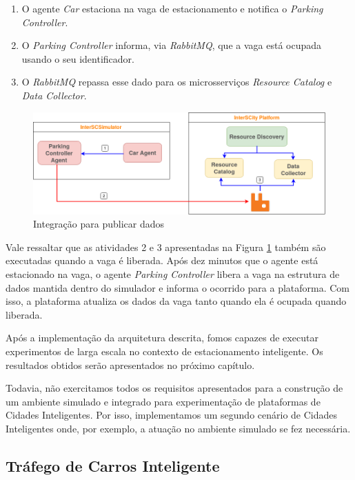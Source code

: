 \begin{enumerate}
    \item O agente \textit{Car} estaciona na vaga de estacionamento e notifica o \textit{Parking Controller}.

	\item O \textit{Parking Controller} informa, via \textit{RabbitMQ}, que a vaga está ocupada usando o seu identificador.

	\item O \textit{RabbitMQ} repassa esse dado para os microsserviços \textit{Resource Catalog} e \textit{Data Collector}.
\end{enumerate}

\begin{figure}[ht]
	\centering
	\includegraphics[width=\textwidth]{figuras/integration_publish_data_smart_parking.png}
	\caption{Integração para publicar dados}
	\label{fig:atualizacao}
\end{figure}

Vale ressaltar que as atividades 2 e 3 apresentadas na Figura \ref{fig:atualizacao} também são executadas quando a vaga é liberada.
Após dez minutos que o agente está estacionado na vaga, o agente \textit{Parking Controller} libera a vaga na estrutura de dados mantida dentro do simulador e informa o
ocorrido para a plataforma.
Com isso, a plataforma atualiza os dados da vaga tanto quando ela é ocupada quando liberada.

Após a implementação da arquitetura descrita, fomos capazes de executar experimentos de larga escala no contexto de estacionamento inteligente.
Os resultados obtidos serão apresentados no próximo capítulo.

Todavia, não exercitamos todos os requisitos apresentados para a construção de um ambiente simulado e integrado para experimentação de plataformas de Cidades Inteligentes.
Por isso, implementamos um segundo cenário de Cidades Inteligentes onde, por exemplo, a atuação no ambiente simulado se fez necessária.


\subsection{Tráfego de Carros Inteligente}
\label{sec:smart_traffic}

